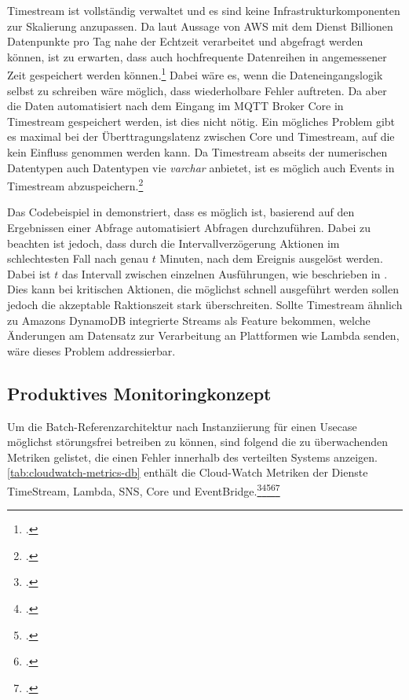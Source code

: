 Timestream ist vollständig verwaltet und es sind keine Infrastrukturkomponenten zur Skalierung anzupassen. Da laut Aussage von \ac{AWS} mit dem Dienst Billionen Datenpunkte pro Tag nahe der Echtzeit verarbeitet und abgefragt werden können, ist zu erwarten, dass auch hochfrequente Datenreihen in angemessener Zeit gespeichert werden können.\footcite[Vgl.][]{AmazonWebServicesInc..2020g} Dabei wäre es, wenn die Dateneingangslogik selbst zu schreiben wäre möglich, dass wiederholbare Fehler auftreten. Da aber die Daten automatisiert nach dem Eingang im \ac{MQTT} Broker \AWSIOT{} Core in Timestream gespeichert werden, ist dies nicht nötig. Ein mögliches Problem gibt es maximal bei der Überttragungslatenz zwischen \AWSIOT{} Core und Timestream, auf die kein Einfluss genommen werden kann.
Da Timestream abseits der numerischen Datentypen auch Datentypen vie \textit{varchar} anbietet, ist es möglich auch Events in Timestream abzuspeichern.\footcite[Vgl.][]{AmazonWebServicesInc..o.J.r}


Das Codebeispiel in  demonstriert, dass es möglich ist, basierend auf den Ergebnissen einer Abfrage automatisiert Abfragen durchzuführen. Dabei zu beachten ist jedoch, dass durch die Intervallverzögerung Aktionen im schlechtesten Fall nach genau $t$ Minuten, nach dem Ereignis ausgelöst werden. Dabei ist $t$ das Intervall zwischen einzelnen Ausführungen, wie beschrieben in . Dies kann bei kritischen Aktionen, die möglichst schnell ausgeführt werden sollen jedoch die akzeptable Raktionszeit stark überschreiten. Sollte Timestream ähnlich zu Amazons DynamoDB integrierte Streams als Feature bekommen, welche Änderungen am Datensatz zur Verarbeitung an Plattformen wie Lambda senden, wäre dieses Problem addressierbar.

\subsection{Produktives Monitoringkonzept}
Um die Batch-Referenzarchitektur nach Instanziierung für einen Usecase möglichst störungsfrei betreiben zu können, sind folgend die zu überwachenden Metriken gelistet, die einen Fehler innerhalb des verteilten Systems anzeigen.\autoref{tab:cloudwatch-metrics-db} enthält die Cloud-Watch Metriken der Dienste TimeStream, Lambda, \ac{SNS}, \AWSIOT{} Core und EventBridge.\footcite[Vgl.][]{AmazonWebServicesInc..o.J.be}\nzitat\footcite[Vgl.][]{AmazonWebServicesInc..o.J.bf}\nzitat\footcite[Vgl.][]{AmazonWebServicesInc..o.J.bc}\nzitat\footcite[Vgl.][]{AmazonWebServicesInc..o.J.az}\nzitat\footcite[Vgl.][]{AmazonWebServicesInc..o.J.bl}


